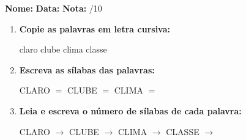 \begin{exercicio}



\noindent\textbf{Nome:} \underline{\hspace{3.2cm}} \quad \textbf{Data:} \underline{\hspace{1.6cm}} \quad \textbf{Nota:} \underline{\hspace{0.9cm}}/10


\begin{enumerate}

  \item \textbf{Copie as palavras em letra cursiva:}
  \begin{center}
  claro \quad clube \quad clima \quad classe
  \end{center}
  \begin{center}
  \underline{\hspace{2.4cm}} \quad \underline{\hspace{2.4cm}} \quad \underline{\hspace{2.4cm}} \quad \underline{\hspace{2.4cm}}
  \end{center}

  \item \textbf{Escreva as sílabas das palavras:}
  \begin{center}
  CLARO $=$ \underline{\hspace{1.5cm}} \underline{\hspace{1.5cm}} \quad CLUBE $=$ \underline{\hspace{1.5cm}} \underline{\hspace{1.5cm}} \quad CLIMA $=$ \underline{\hspace{1.5cm}} \underline{\hspace{1.5cm}}
  \end{center}

  \item \textbf{Leia e escreva o número de sílabas de cada palavra:}
  \begin{center}
  CLARO $\rightarrow$ \underline{\hspace{0.9cm}} \quad CLUBE $\rightarrow$ \underline{\hspace{0.9cm}} \quad CLIMA $\rightarrow$ \underline{\hspace{0.9cm}} \quad CLASSE $\rightarrow$ \underline{\hspace{0.9cm}}
  \end{center}


\end{enumerate}
\end{exercicio}
